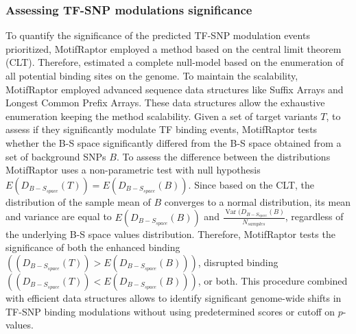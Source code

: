 \documentclass[a4paper, titlepage, openright]{book}
\DeclareMathOperator*{\Var}{Var}
\newcommand{\motifraptor}{MotifRaptor\xspace}
\begin{document}
\subsubsection{Assessing TF-SNP modulations significance}
To quantify the significance of the predicted TF-SNP modulation events prioritized, \motifraptor employed a method based on the central limit theorem (CLT). Therefore,  estimated a complete null-model based on the enumeration of all potential binding sites on the genome. To maintain the scalability, \motifraptor employed advanced sequence data structures like Suffix Arrays and Longest Common Prefix Arrays. These data structures allow the exhaustive enumeration keeping the method scalability.  Given a set of target variants $T$, to assess if they significantly modulate TF binding events, \motifraptor tests whether the B-S space significantly differed from the B-S space obtained from a set of background SNPs $B$.  To assess the difference between the distributions \motifraptor uses a non-parametric test with null hypothesis $E(D_{B-S_{space}}(T))=E(D_{B-S_{space}}(B))$. Since based on the CLT, the distribution of the sample mean of $B$ converges to a normal distribution, its mean and variance are equal to $E(D_{B-S_{space}}(B))$ and $\frac{\Var(D_{B-S_{space}}(B)}{N_{samples}}$,  regardless of the underlying B-S space values distribution. Therefore, \motifraptor tests the significance of both the enhanced binding $((D_{B-S_{space}}(T)) > E(D_{B-S_{space}}(B)))$, disrupted binding $((D_{B-S_{space}}(T)) < E(D_{B-S_{space}}(B)))$, or both. This procedure combined with efficient data structures allows to identify significant genome-wide shifts in TF-SNP binding modulations without using predetermined scores or cutoff on $p$-values.
\end{document}
